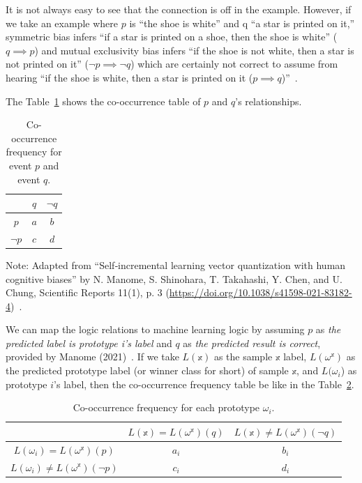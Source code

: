 It is not always easy to see that the connection is off in the example. However, if we take an example where $p$ is “the shoe is white” and q “a star is printed on it,” symmetric bias infers “if a star is printed on a shoe, then the shoe is white” ($q \implies p$) and mutual exclusivity bias infers “if the shoe is not white, then a star is not printed on it” ($\neg p \implies \neg q$) which are certainly not correct to assume from hearing “if the shoe is white, then a star is printed on it ($p \implies q$)”~\cite{els}.

The Table~\ref{co-occorj} shows the co-occurrence table of $p$ and $q$'s relationships.

\begin{table}[H]
    \centering
    \begin{tabular}{| c ||c| c|}
    \hline
         & $q$ & $\neg q$  \\
         \hline
         $p$& $a$ & $b$\\
         \hline
         $\neg p$ & $c$ & $d$\\
         \hline
    \end{tabular}
    \caption{Co-occurrence frequency for event $p$ and event $q$.}
    \label{co-occorj}
\end{table}

\noindent Note: Adapted from “Self‑incremental learning vector
quantization with human cognitive
biases” by N. Manome, S. Shinohara, T. Takahashi, Y. Chen, and U. Chung, Scientific Reports 11(1), p. 3 (\url{https://doi.org/10.1038/s41598-021-83182-4})~\cite{lrimp}.
\vspace{10pt}

We can map the logic relations to machine learning logic by assuming $p$ as \textit{the predicted label is prototype i’s label} and $q$ as \textit{the predicted result is correct}, provided by Manome (2021)~\cite{lrimp}. If we take $L(\mathbb{x})$ as the sample $\mathbb{x}$ label, $L(\omega^{\mathbb{x}})$ as the predicted prototype label (or winner class for short) of sample $\mathbb{x}$, and $L(\omega_{i}$) as prototype $i$’s label, then the co-occurrence frequency table be like in the Table~\ref{co-occ}.


\begin{table}[H]
\centering
\begin{tabular}{| c ||c| c| }
\hline
  & $L(\mathbb{x}) = L(\omega^{\mathbb{x}}) (q)$ & $L(\mathbb{x}) \neq L(\omega^{\mathbb{x}}) (\neg q)$\\[0.5ex]
 \hline\hline
 $L(\omega_{i}) = L(\omega^{\mathbb{x}}) (p)$ &$a_{i}$ &$b_{i}$ \\
 \hline
 $L(\omega_{i}) \neq L(\omega^{\mathbb{x}}) (\neg p)$ & $c_{i}$ & $d_{i}$ \\
 \hline
\end{tabular}
\caption{Co-occurrence frequency for each prototype $\omega_{i}$.}
\label{co-occ}
\end{table}

